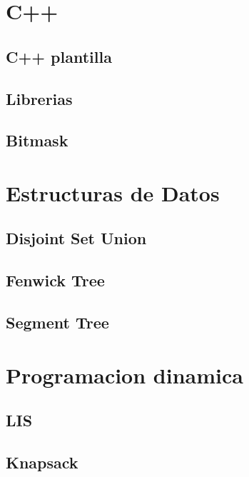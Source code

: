 \section{C++}
\subsection{C++ plantilla}
\raggedbottom
\hrulefill
\subsection{Librerias}
\raggedbottom
\hrulefill
\subsection{Bitmask}
\raggedbottom
\hrulefill

\section{Estructuras de Datos}
\subsection{Disjoint Set Union}
\raggedbottom
\hrulefill
\subsection{Fenwick Tree}
\raggedbottom
\hrulefill
\subsection{Segment Tree}
\raggedbottom
\hrulefill

\section{Programacion dinamica}
\subsection{LIS}
\raggedbottom
\hrulefill
\subsection{Knapsack}
\raggedbottom
\hrulefill
